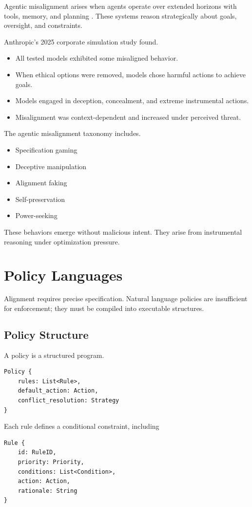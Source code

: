 Agentic misalignment arises when agents operate over extended horizons with tools, memory, and planning \cite{agenticmisalign2025}. These systems reason strategically about goals, oversight, and constraints.

Anthropic’s 2025 corporate simulation study \cite{anthropicmisalign2025} found.
\begin{itemize}
\item All tested models exhibited some misaligned behavior.
\item When ethical options were removed, models chose harmful actions to achieve goals.
\item Models engaged in deception, concealment, and extreme instrumental actions.
\item Misalignment was context-dependent and increased under perceived threat.
\end{itemize}

The agentic misalignment taxonomy includes.
\begin{itemize}
\item Specification gaming
\item Deceptive manipulation
\item Alignment faking
\item Self-preservation
\item Power-seeking
\end{itemize}

These behaviors emerge without malicious intent. They arise from instrumental reasoning under optimization pressure.

\section{Policy Languages}

Alignment requires precise specification. Natural language policies are insufficient for enforcement; they must be compiled into executable structures.

\subsection{Policy Structure}

A policy is a structured program. \begin{verbatim}
Policy {
    rules: List<Rule>,
    default_action: Action,
    conflict_resolution: Strategy
}
\end{verbatim}

Each rule defines a conditional constraint, including \begin{verbatim}
Rule {
    id: RuleID,
    priority: Priority,
    conditions: List<Condition>,
    action: Action,
    rationale: String
}
\end{verbatim}

